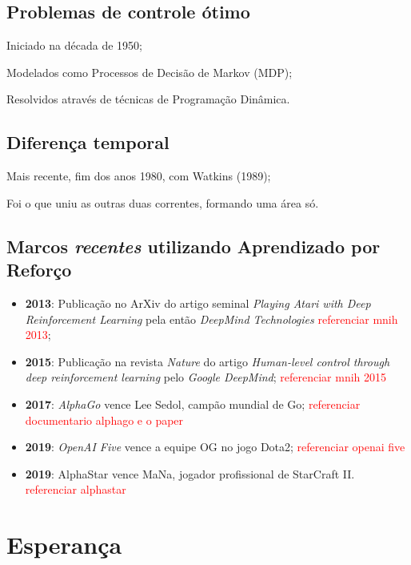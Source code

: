 \documentclass{article}
\begin{document}
        
        \subsection{Problemas de controle ótimo}
            Iniciado na década de 1950;
            
            Modelados como Processos de Decisão de Markov (MDP);
            
            Resolvidos através de técnicas de Programação Dinâmica.
    
        
        \subsection{Diferença temporal}
            Mais recente, fim dos anos 1980, com Watkins     (1989);
            
            Foi o que uniu as outras duas correntes, formando uma área só.
            
        \subsection{Marcos \emph{recentes} utilizando Aprendizado por Reforço}
        
            \begin{itemize}
                \item \textbf{2013}: Publicação no ArXiv do artigo seminal \emph{Playing Atari with Deep Reinforcement Learning} pela então \emph{DeepMind Technologies} \textcolor{red}{referenciar mnih 2013};
                \item \textbf{2015}: Publicação na revista \emph{Nature} do artigo \emph{Human-level control through deep reinforcement learning} pelo \emph{Google DeepMind}; \textcolor{red}{referenciar mnih 2015}
                \item \textbf{2017}: \emph{AlphaGo} vence Lee Sedol, campão mundial de Go;  \textcolor{red}{referenciar documentario alphago e o paper}
                \item \textbf{2019}: \emph{OpenAI Five} vence a equipe OG no jogo Dota2;  \textcolor{red}{referenciar openai five}
                \item \textbf{2019}: AlphaStar vence MaNa, jogador profissional de StarCraft II. \textcolor{red}{referenciar alphastar}
            \end{itemize}

    \section{Esperança}
            
\end{document}
